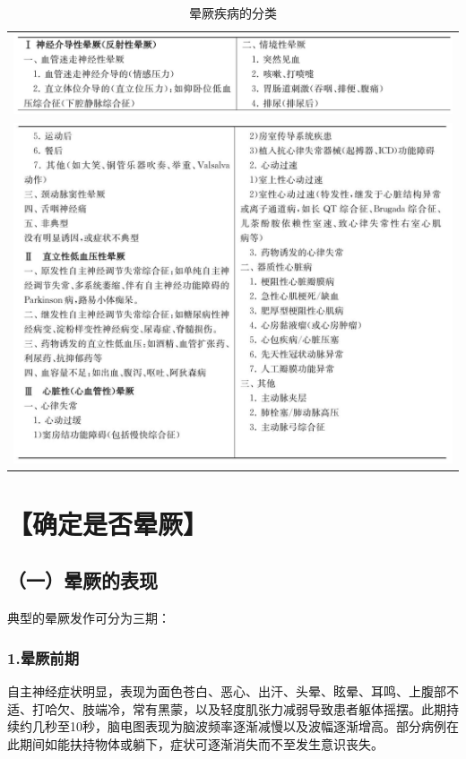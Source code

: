 \begin{longtable}{c}
 \caption{晕厥疾病的分类}
 \label{tab48-1}
 \endfirsthead
 \caption[]{晕厥疾病的分类}
 \endhead
 \includegraphics[width=\textwidth,height=\textheight,keepaspectratio]{./images/Image00303.jpg}\\
 \includegraphics[width=\textwidth,height=\textheight,keepaspectratio]{./images/Image00304.jpg}
 \end{longtable}

\section{【确定是否晕厥】}

\subsection{（一）晕厥的表现}

典型的晕厥发作可分为三期：

\subsubsection{1.晕厥前期}

自主神经症状明显，表现为面色苍白、恶心、出汗、头晕、眩晕、耳鸣、上腹部不适、打哈欠、肢端冷，常有黑蒙，以及轻度肌张力减弱导致患者躯体摇摆。此期持续约几秒至10秒，脑电图表现为脑波频率逐渐减慢以及波幅逐渐增高。部分病例在此期间如能扶持物体或躺下，症状可逐渐消失而不至发生意识丧失。

